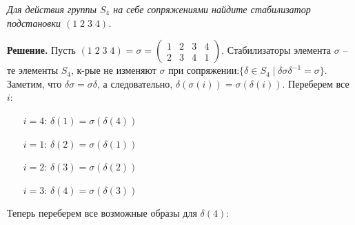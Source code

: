 \documentclass[a4paper, 12pt]{article}
\begin{document}
\begin{spacing}{1}
\newpage
\begin{center}
\end{center}

\noindent \textit{Для действия группы $S_4$ на себе сопряжениями найдите стабилизатор подстановки $(1\;2\;3\;4)$.}

\noindent \textbf{Решение.} Пусть $(1\;2\;3\;4) = \sigma = \begin{pmatrix}
1 & 2 & 3 & 4 \\
2 & 3 & 4 & 1
\end{pmatrix}$. Стабилизаторы элемента $\sigma$ -- те элементы $S_4$, к-рые не изменяют $\sigma$ при сопряжении:$\{\delta \in S_4\;|\;\delta \sigma \delta^{-1} = \sigma\}$. Заметим, что $\delta \sigma = \sigma \delta$, а следовательно, $\delta(\sigma(i)) = \sigma(\delta(i))$. Переберем все $i$:
\begin{enumerate}
	\item[$i = 4$:] $\delta(1) = \sigma(\delta(4))$
	\item[$i = 1$:] $\delta(2) = \sigma(\delta(1))$
	\item[$i = 2$:] $\delta(3) = \sigma(\delta(2))$
	\item[$i = 3$:] $\delta(4) = \sigma(\delta(3))$
\end{enumerate}
Теперь переберем все возможные образы для $\delta(4)$:
\end{spacing}
\end{document}
